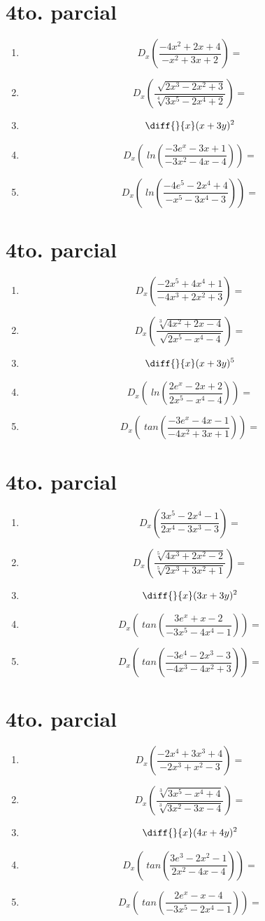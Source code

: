 \documentclass[oneside,spanish,letter]{article}
\begin{document}
\section{4to. parcial}
\begin{enumerate}
 \item $$ D_x \left( \frac{-4x^2+2x+4}{-x^2+3x+2}\right)=$$
 \item $$ D_x \left( \frac{\sqrt[]{2x^3-2x^2+3}}{\sqrt[4]{3x^5-2x^4+2}}\right)=$$
\item $$\diff{}{x}(x+3y)^2$$
 \item $$ D_x \left(\;ln\left( \frac{-3e^x-3x+1}{-3x^2-4x-4}\right)\right)=$$
 \item $$ D_x \left(\;ln\left( \frac{-4e^5-2x^4+4}{-x^5-3x^4-3}\right)\right)=$$
 \end{enumerate}
  \newpage
\section{4to. parcial}
\begin{enumerate}
 \item $$ D_x \left( \frac{-2x^5+4x^4+1}{-4x^3+2x^2+3}\right)=$$
 \item $$ D_x \left( \frac{\sqrt[3]{4x^2+2x-4}}{\sqrt[]{2x^5-x^4-4}}\right)=$$
\item $$\diff{}{x}(x+3y)^5$$
 \item $$ D_x \left(\;ln\left( \frac{2e^x-2x+2}{2x^5-x^4-4}\right)\right)=$$
 \item $$ D_x \left(\;tan\left( \frac{-3e^x-4x-1}{-4x^2+3x+1}\right)\right)=$$
 \end{enumerate}
  \newpage
\section{4to. parcial}
\begin{enumerate}
 \item $$ D_x \left( \frac{3x^5-2x^4-1}{2x^4-3x^3-3}\right)=$$
 \item $$ D_x \left( \frac{\sqrt[5]{4x^3+2x^2-2}}{\sqrt[5]{2x^3+3x^2+1}}\right)=$$
\item $$\diff{}{x}(3x+3y)^2$$
 \item $$ D_x \left(\;tan\left( \frac{3e^x+x-2}{-3x^5-4x^4-1}\right)\right)=$$
 \item $$ D_x \left(\;tan\left( \frac{-3e^4-2x^3-3}{-4x^3-4x^2+3}\right)\right)=$$
 \end{enumerate}
  \newpage
\section{4to. parcial}
\begin{enumerate}
 \item $$ D_x \left( \frac{-2x^4+3x^3+4}{-2x^3+x^2-3}\right)=$$
 \item $$ D_x \left( \frac{\sqrt[3]{3x^5-x^4+4}}{\sqrt[3]{3x^2-3x-4}}\right)=$$
\item $$\diff{}{x}(4x+4y)^2$$
 \item $$ D_x \left(\;tan\left( \frac{3e^3-2x^2-1}{2x^2-4x-4}\right)\right)=$$
 \item $$ D_x \left(\;tan\left( \frac{2e^x-x-4}{-3x^5-2x^4-1}\right)\right)=$$
 \end{enumerate}
  \newpage
\end{document}
